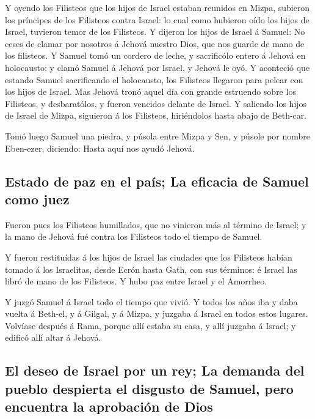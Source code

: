  Y oyendo los Filisteos que los hijos de Israel estaban
reunidos en Mizpa, subieron los príncipes de los Filisteos contra
Israel: lo cual como hubieron oído los hijos de Israel, tuvieron temor
de los Filisteos.  Y dijeron los hijos de Israel á Samuel:
No ceses de clamar por nosotros á Jehová nuestro Dios, que nos guarde de
mano de los filisteos.  Y Samuel tomó un cordero de leche, y
sacrificólo entero á Jehová en holocausto: y clamó Samuel á Jehová por
Israel, y Jehová le oyó.  Y aconteció que estando Samuel
sacrificando el holocausto, los Filisteos llegaron para pelear con los
hijos de Israel. Mas Jehová tronó aquel día con grande estruendo sobre
los Filisteos, y desbaratólos, y fueron vencidos delante de Israel.
 Y saliendo los hijos de Israel de Mizpa, siguieron á los
Filisteos, hiriéndolos hasta abajo de Beth-car.

 Tomó luego Samuel una piedra, y púsola entre Mizpa y Sen,
y púsole por nombre Eben-ezer, diciendo: Hasta aquí nos ayudó Jehová.

\hypertarget{estado-de-paz-en-el-pauxeds-la-eficacia-de-samuel-como-juez}{%
\subsection{Estado de paz en el país; La eficacia de Samuel como
juez}\label{estado-de-paz-en-el-pauxeds-la-eficacia-de-samuel-como-juez}}

 Fueron pues los Filisteos humillados, que no vinieron más
al término de Israel; y la mano de Jehová fué contra los Filisteos todo
el tiempo de Samuel.

 Y fueron restituídas á los hijos de Israel las ciudades
que los Filisteos habían tomado á los Israelitas, desde Ecrón hasta
Gath, con sus términos: é Israel las libró de mano de los Filisteos. Y
hubo paz entre Israel y el Amorrheo.

 Y juzgó Samuel á Israel todo el tiempo que vivió.
 Y todos los años iba y daba vuelta á Beth-el, y á Gilgal,
y á Mizpa, y juzgaba á Israel en todos estos lugares. 
Volvíase después á Rama, porque allí estaba su casa, y allí juzgaba á
Israel; y edificó allí altar á Jehová.

\hypertarget{el-deseo-de-israel-por-un-rey-la-demanda-del-pueblo-despierta-el-disgusto-de-samuel-pero-encuentra-la-aprobaciuxf3n-de-dios}{%
\subsection{El deseo de Israel por un rey; La demanda del pueblo
despierta el disgusto de Samuel, pero encuentra la aprobación de
Dios}\label{el-deseo-de-israel-por-un-rey-la-demanda-del-pueblo-despierta-el-disgusto-de-samuel-pero-encuentra-la-aprobaciuxf3n-de-dios}}

